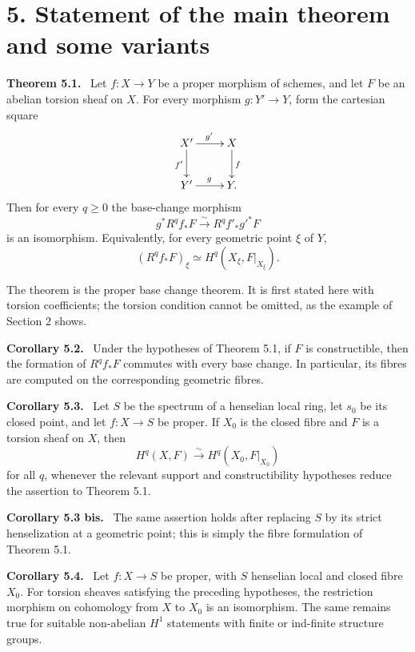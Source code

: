 \documentclass[11pt]{article}
\newenvironment{statement}[1]{\par\medskip\noindent\textbf{#1.}\ }{\par\medskip}
\begin{document}
\section*{5. Statement of the main theorem and some variants}

\begin{statement}{Theorem 5.1}
Let \(f:X\to Y\) be a proper morphism of schemes, and let \(F\) be an abelian torsion sheaf on \(X\). For every morphism \(g:Y'\to Y\), form the cartesian square
\[
\xymatrix{
X'\ar[r]^{g'}\ar[d]_{f'}&X\ar[d]^f\\
Y'\ar[r]^g&Y.
}
\]
Then for every \(q\geq0\) the base-change morphism
\[
g^*R^qf_*F\xrightarrow{\sim}R^qf'_*g'^*F
\]
is an isomorphism. Equivalently, for every geometric point \(\xi\) of \(Y\),
\[
(R^qf_*F)_\xi\simeq H^q(X_\xi,F|_{X_\xi}).
\]
\end{statement}

The theorem is the proper base change theorem. It is first stated here with torsion coefficients; the torsion condition cannot be omitted, as the example of Section 2 shows.

\begin{statement}{Corollary 5.2}
Under the hypotheses of Theorem 5.1, if \(F\) is constructible, then the formation of \(R^qf_*F\) commutes with every base change. In particular, its fibres are computed on the corresponding geometric fibres.
\end{statement}

\begin{statement}{Corollary 5.3}
Let \(S\) be the spectrum of a henselian local ring, let \(s_0\) be its closed point, and let \(f:X\to S\) be proper. If \(X_0\) is the closed fibre and \(F\) is a torsion sheaf on \(X\), then
\[
H^q(X,F)\xrightarrow{\sim}H^q(X_0,F|_{X_0})
\]
for all \(q\), whenever the relevant support and constructibility hypotheses reduce the assertion to Theorem 5.1.
\end{statement}

\begin{statement}{Corollary 5.3 bis}
The same assertion holds after replacing \(S\) by its strict henselization at a geometric point; this is simply the fibre formulation of Theorem 5.1.
\end{statement}

\begin{statement}{Corollary 5.4}
Let \(f:X\to S\) be proper, with \(S\) henselian local and closed fibre \(X_0\). For torsion sheaves satisfying the preceding hypotheses, the restriction morphism on cohomology from \(X\) to \(X_0\) is an isomorphism. The same remains true for suitable non-abelian \(H^1\) statements with finite or ind-finite structure groups.
\end{statement}
\end{document}
